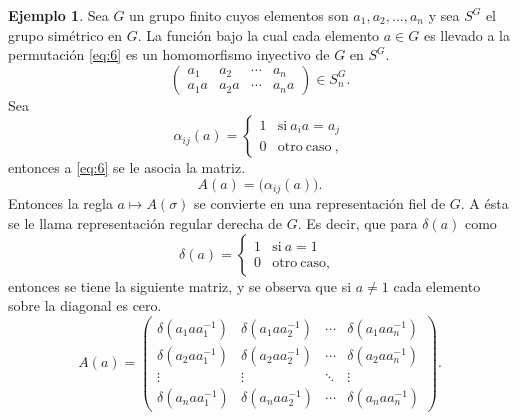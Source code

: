 \documentclass[12pt]{book}
\theoremstyle{definition}
\newtheorem{example}[theorem]{Ejemplo}
\newcounter{in}
\newcounter{ini}
\begin{document}
\begin{example}
  \label{Ej4}
  Sea $G$ un grupo finito cuyos elementos son $a_{1},a_{2},...,a_{n}$
  y sea $S^{G}$ el grupo simétrico en $G$. La función bajo la cual
  cada elemento $a \in G$ es llevado a la permutación \ref{eq:6} es un
  homomorfismo inyectivo de $G$ en $S^{G}$.
  \begin{equation}
    \label{eq:6}
    \begin{pmatrix}
      a_{1} & a_{2} & \cdots  & a_{n}\\
      a_{1}a & a_{2}a & \cdots & a_{n}a
    \end{pmatrix} 
    \in S_{n}^{G}.
  \end{equation}
  Sea
  \begin{equation*}
    \alpha_{ij} (a) = \left\{
      \begin{array}{ll}
        1      & \mathrm{si\ } a_{i}a = a_{j} \\
        0      & \mathrm{otro\ caso\ }, 
      \end{array}
    \right. 
  \end{equation*}
  entonces a \ref{eq:6} se le asocia la matriz. 
  \begin{equation*}
    A(a)=\big(\alpha_{ij}(a)\big).
  \end{equation*} 
  Entonces la regla $a \mapsto A\left(\sigma\right)$ se convierte en
  una representación fiel de $G$. A ésta se le llama representación
  regular derecha de $G$. Es decir, que para $\delta{(a)}$ como 
  \begin{equation*}
    \delta{(a)} = \left\{
      \begin{array}{ll}
        1      & \mathrm{si\ } a = 1 \\
        0      & \mathrm{otro\ caso,\ } 
      \end{array}
    \right.
  \end{equation*}
  entonces se tiene la siguiente matriz, y se observa que si
  $a \neq 1$ cada elemento sobre la diagonal es cero.
  \begin{equation}
    \label{eq:7}
    A\left(a\right) = 
    \begin{pmatrix}
      \delta\left(a_{1}aa_{1}^{-1}\right) & \delta\left(a_{1}aa_{2}^{-1}\right) & \cdots  & \delta\left(a_{1}aa_{n}^{-1}\right)\\
      \delta\left(a_{2}aa_{1}^{-1}\right) & \delta\left(a_{2}aa_{2}^{-1}\right) & \cdots  & \delta\left(a_{2}aa_{n}^{-1}\right)\\ 
      \vdots & \vdots & \ddots & \vdots\\
      \delta\left(a_{n}aa_{1}^{-1}\right) & \delta\left(a_{n}aa_{2}^{-1}\right) & \cdots  & \delta\left(a_{n}aa_{n}^{-1}\right)
    \end{pmatrix}
    .
  \end{equation}


\end{example}
\end{document}
